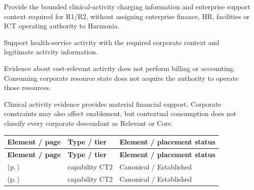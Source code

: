 
Provide the bounded clinical-activity charging information and enterprise support context required for R1/\allowbreak{}R2, without assigning enterprise finance, HR, facilities or ICT operating authority to Harmonia.



Support health-service activity with the required corporate context and legitimate activity information.



Evidence about cost-relevant activity does not perform billing or accounting. Consuming corporate resource state does not acquire the authority to operate those resources.



Clinical activity evidence provides material financial support. Corporate constraints may also affect enablement, but contextual consumption does not classify every corporate descendant as Relevant or Core.


\begingroup\small\setlength{\TableWidth}{\dimexpr\linewidth-6\tabcolsep-4\arrayrulewidth\relax}
\begin{longtable}{|>{\raggedright\arraybackslash}p{0.52\TableWidth}|>{\raggedright\arraybackslash}p{0.2\TableWidth}|>{\raggedright\arraybackslash}p{0.28\TableWidth}|}
\hline\rowcolor{TableHead}\textbf{Element / page} & \textbf{Type / tier} & \textbf{Element / placement status}\\\hline\endfirsthead
\hline\rowcolor{TableHead}\textbf{Element / page} & \textbf{Type / tier} & \textbf{Element / placement status}\\\hline\endhead
\hline\endfoot
\nameref{cap:bc-financial-commercial-services} (p.\,\pageref{cap:bc-financial-commercial-services}) & capability CT2 & Canonical / Established\\\hline
\nameref{cap:bc-corporate-support-services} (p.\,\pageref{cap:bc-corporate-support-services}) & capability CT2 & Canonical / Established\\\hline
\end{longtable}\endgroup

